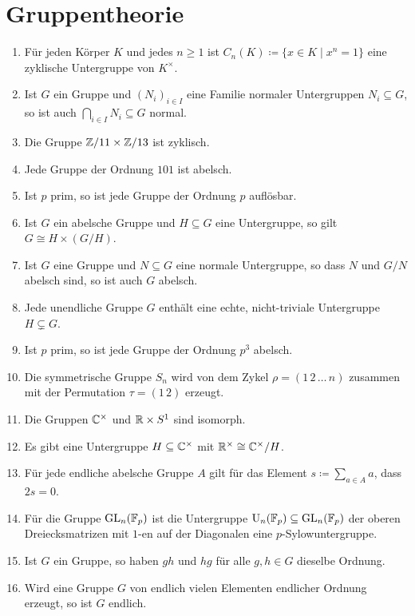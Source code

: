\section{Gruppentheorie}


\begin{question}[subtitle = Wahr oder Falsch?]
  \begin{enumerate}
    \item
      Für jeden Körper $K$ und jedes $n \geq 1$ ist $C_n(K) \coloneqq \{x \in K \mid x^n = 1\}$ eine zyklische Untergruppe von $K^\times$.
    \item
      Ist $G$ ein Gruppe und $(N_i)_{i \in I}$ eine Familie normaler Untergruppen $N_i \subseteq G$, so ist auch $\bigcap_{i \in I} N_i \subseteq G$ normal.
    \item
      Die Gruppe $\mathbb{Z}/11 \times \mathbb{Z}/13$ ist zyklisch.
    \item
      Jede Gruppe der Ordnung $101$ ist abelsch.
    \item
      Ist $p$ prim, so ist jede Gruppe der Ordnung $p$ auflösbar.
    \item
      Ist $G$ ein abelsche Gruppe und $H \subseteq G$ eine Untergruppe, so gilt $G \cong H \times (G/H)$.
    \item
      Ist $G$ eine Gruppe und $N \subseteq G$ eine normale Untergruppe, so dass $N$ und $G/N$ abelsch sind, so ist auch $G$ abelsch.
    \item
      Jede unendliche Gruppe $G$ enthält eine echte, nicht-triviale Untergruppe $H \subsetneq G$.
    \item
      Ist $p$ prim, so ist jede Gruppe der Ordnung $p^3$ abelsch.
    \item
      Die symmetrische Gruppe $S_n$ wird von dem Zykel $\rho = (1 \, 2 \, \dotso \, n)$ zusammen mit der Permutation $\tau = (1 \, 2)$ erzeugt.
    \item
      Die Gruppen $\mathbb{C}^\times$ und $\mathbb{R} \times S^1$ sind isomorph.
    \item
      Es gibt eine Untergruppe $H \subseteq \mathbb{C}^\times$ mit $\mathbb{R}^\times \cong \mathbb{C}^\times/H$.
    \item
      Für jede endliche abelsche Gruppe $A$ gilt für das Element $s \coloneqq \sum_{a \in A} a$, dass $2 s = 0$.
    \item
      Für die Gruppe $\operatorname{GL}_n(\mathbb{F}_p)$ ist die Untergruppe $\operatorname{U}_n(\mathbb{F}_p) \subseteq \operatorname{GL}_n(\mathbb{F}_p)$ der oberen Dreiecksmatrizen mit $1$-en auf der Diagonalen eine $p$-Sylow\-unter\-gruppe.
    \item
      Ist $G$ ein Gruppe, so haben $gh$ und $hg$ für alle $g, h \in G$ dieselbe Ordnung.
    \item
      Wird eine Gruppe $G$ von endlich vielen Elementen endlicher Ordnung erzeugt, so ist $G$ endlich.
  \end{enumerate}
\end{question}


